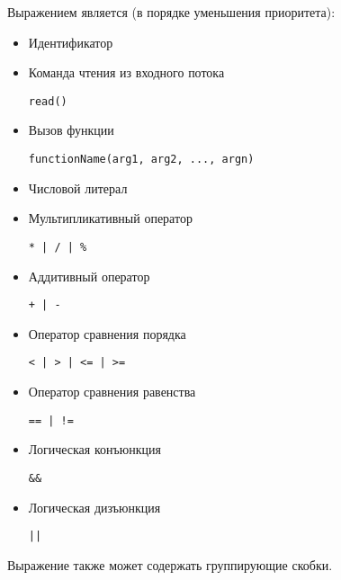 Выражением является (в порядке уменьшения приоритета):
\begin{itemize}
    \item Идентификатор\\
    
    \item Команда чтения из входного потока
\begin{lstlisting}
read()
\end{lstlisting}
    
    \item Вызов функции
\begin{lstlisting}
functionName(arg1, arg2, ..., argn)
\end{lstlisting}
    
    \item Числовой литерал\\
    
    \item Мультипликативный оператор
\begin{lstlisting}
* | / | %
\end{lstlisting}
    
    \item Аддитивный оператор
\begin{lstlisting}
+ | -
\end{lstlisting}
    
    \item Оператор сравнения порядка
\begin{lstlisting}
< | > | <= | >=
\end{lstlisting}
    
    \item Оператор сравнения равенства
\begin{lstlisting}
== | !=
\end{lstlisting}
    
    \item Логическая конъюнкция
\begin{lstlisting}
&&
\end{lstlisting}
    
    \item Логическая дизъюнкция
\begin{lstlisting}
||
\end{lstlisting}
\end{itemize}

Выражение также может содержать группирующие скобки.


